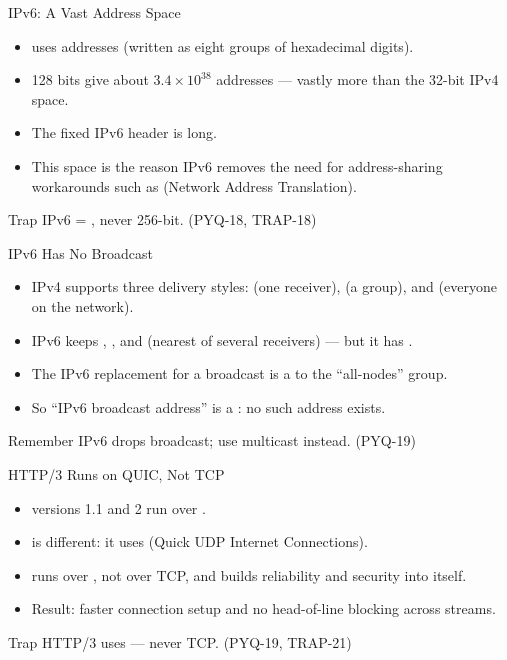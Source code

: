 \documentclass[aspectratio=169]{beamer}
\begin{document}
\begin{frame}{IPv6: A Vast Address Space}
  \begin{itemize}
    \item {} uses  addresses (written as eight groups of
      hexadecimal digits).
    \item 128 bits give about $3.4 \times 10^{38}$ addresses --- vastly more
      than the 32-bit IPv4 space.
    \item The fixed IPv6 header is  long.
    \item This space is the reason IPv6 removes the need for address-sharing
      workarounds such as  (Network Address Translation).
  \end{itemize}
  \begin{alertblock}{Trap}
    IPv6 = , never 256-bit. (PYQ-18, TRAP-18)
  \end{alertblock}
\end{frame}

\begin{frame}{IPv6 Has No Broadcast}
  \begin{itemize}
    \item IPv4 supports three delivery styles:  (one receiver),
       (a group), and  (everyone on the
      network).
    \item IPv6 keeps , , and  (nearest
      of several receivers) --- but it has .
    \item The IPv6 replacement for a broadcast is a  to the
      ``all-nodes'' group.
    \item So ``IPv6 broadcast address'' is a : no such
      address exists.
  \end{itemize}
  \begin{block}{Remember}
    IPv6 drops broadcast; use multicast instead. (PYQ-19)
  \end{block}
\end{frame}

\begin{frame}{HTTP/3 Runs on QUIC, Not TCP}
  \begin{itemize}
    \item {} versions 1.1 and 2 run over .
    \item {} is different: it uses  (Quick UDP Internet
      Connections).
    \item {} runs over , not over TCP, and builds reliability
      and security into itself.
    \item Result: faster connection setup and no head-of-line blocking across
      streams.
  \end{itemize}
  \begin{alertblock}{Trap}
    HTTP/3 uses  --- never TCP. (PYQ-19, TRAP-21)
  \end{alertblock}
\end{frame}
\end{document}
